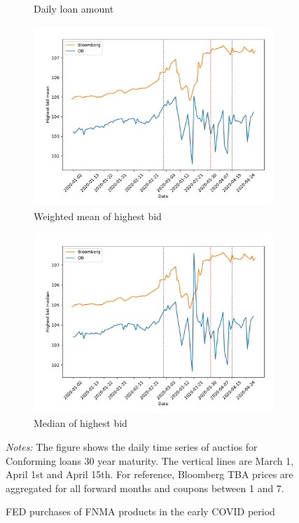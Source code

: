 \documentclass[11pt,a4paper]{article}
\begin{document}
\begin{figure}[h]
\begin{subfigure}[b]{0.49\textwidth}
      \caption{ Daily loan amount}
     \end{subfigure}
     \begin{subfigure}[b]{0.49\textwidth}
      \includegraphics[width=0.998\textwidth]{../results/figures/w_winner_bid_mean_mat30_loan1_timeseries_nr_1_7.pdf}
      \caption{ Weighted mean of highest bid}
     \end{subfigure}
     \begin{subfigure}[b]{0.49\textwidth}
      \includegraphics[width=0.998\textwidth]{../results/figures/winner_bid_median_mat30_loan1_timeseries_nr_1_7.pdf}
      \caption{ Median of highest bid}
     \end{subfigure}
   \caption{FED purchases of FNMA products in the early COVID period} 
   \begin{minipage}{\textwidth}
      \footnotesize{\textit{Notes:} The figure shows the daily time series of auctios for Conforming loans 30 year maturity. The vertical lines are March 1, April 1st and April 15th. For reference, Bloomberg TBA prices are aggregated for all forward months and coupons between 1 and 7. }
      \end{minipage}
\end{figure}
\end{document}
